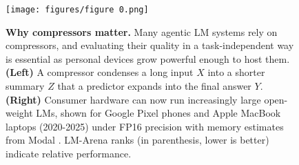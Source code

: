 \documentclass{article} %
\begin{document}
\begin{abstract}
\end{abstract}

\begin{figure}[ht]
    \centering
    \texttt{[image: figures/figure 0.png]}
    \caption{
    \textbf{Why compressors matter.} Many agentic LM systems rely on compressors, and evaluating their quality in a task-independent way is essential as personal devices grow powerful enough to host them. \textbf{(Left)} A compressor condenses a long input \(X\) into a shorter summary \(Z\) that a predictor expands into the final answer \(Y\).
    \textbf{(Right)} Consumer hardware can now run increasingly large open-weight LMs, shown for Google Pixel phones and Apple MacBook laptops (2020-2025) under FP16 precision with memory estimates from Modal \citep{modal2024vram}. LM-Arena ranks (in parenthesis, lower is better) indicate relative performance.}
    \label{fig:figure-0-compressors-matter}
\end{figure}
\end{document}
